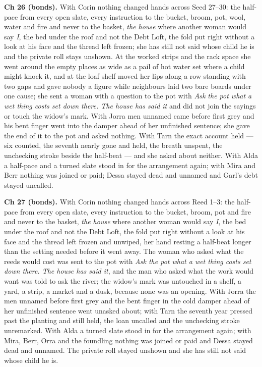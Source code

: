 \documentclass{design/chronicle}
\begin{document}
{\textbf{Ch 26 (bonds).} With Corin nothing changed hands across Seed 27–30: the half-pace from every open slate, every instruction to the bucket, broom, pot, wool, water and fire and never to the basket, \emph{the house} where another woman would say \emph{I}, the bed under the roof and not the Debt Loft, the fold put right without a look at his face and the thread left frozen; she has still not said whose child he is and the private roll stays unshown. At the worked strips and the rack space she went around the empty places as wide as a pail of hot water set where a child might knock it, and at the loaf shelf moved her lips along a row standing with two gaps and gave nobody a figure while neighbours laid two bare boards under one cause; she sent a woman with a question to the pot with \emph{Ask the pot what a wet thing costs set down there. The house has said it} and did not join the sayings or touch the widow’s mark. With Jorra men unnamed came before first grey and his bent finger went into the damper ahead of her unfinished sentence; she gave the end of it to the pot and asked nothing. With Tarn the exact account held — six counted, the seventh nearly gone and held, the breath unspent, the unchecking stroke beside the half-beat — and she asked about neither. With Alda a half-pace and a turned slate stood in for the arrangement again; with Mira and Berr nothing was joined or paid; Dessa stayed dead and unnamed and Garl’s debt stayed uncalled.

\textbf{Ch 27 (bonds).} With Corin nothing changed hands across Reed 1–3: the half-pace from every open slate, every instruction to the bucket, broom, pot and fire and never to the basket, \emph{the house} where another woman would say \emph{I}, the bed under the roof and not the Debt Loft, the fold put right without a look at his face and the thread left frozen and unwiped, her hand resting a half-beat longer than the setting needed before it went away. The woman who asked what the reeds would cost was sent to the pot with \emph{Ask the pot what a wet thing costs set down there. The house has said it}, and the man who asked what the work would want was told to ask the river; the widow’s mark was untouched in a shelf, a yard, a strip, a market and a dusk, because none was an opening. With Jorra the men unnamed before first grey and the bent finger in the cold damper ahead of her unfinished sentence went unasked about; with Tarn the seventh year pressed past the planting and still held, the loan uncalled and the unchecking stroke unremarked. With Alda a turned slate stood in for the arrangement again; with Mira, Berr, Orra and the foundling nothing was joined or paid and Dessa stayed dead and unnamed. The private roll stayed unshown and she has still not said whose child he is.

}
\end{document}
